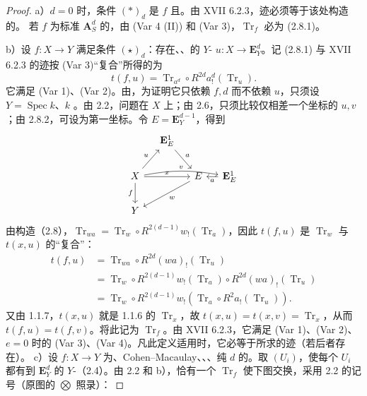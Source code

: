 \begin{proof}
a）$d=0$ 时，条件 $(*)_d$ 是 $f$ 且。由 XVII 6.2.3，迹必须等于该处构造的。
若 $f$ 为标准 $\mathbf A^d_S$ 的，由 (Var 4 (II)) 和 (Var 3)，$\operatorname{Tr}_f$ 必为 (2.8.1)。

b）设 $f:X\to Y$ 满足条件 $(\star)_d$：存在、、的 $Y$- $u:X\to\mathbf E^d_Y$。记 (2.8.1) 与 XVII 6.2.3 的迹按 (Var 3)“复合”所得的为
\[t(f,u)=\operatorname{Tr}_{a^d}\circ R^{2d}a^d_!(\operatorname{Tr}_u).\]
它满足 (Var 1)、(Var 2)。由，为证明它只依赖 $f,d$ 而不依赖 $u$，只须设 $Y=\operatorname{Spec}k$、$k$ 。由 2.2，问题在 $X$ 上；由 2.6，只须比较仅相差一个坐标的 $u,v$；由 2.8.2，可设为第一坐标。令 $E=\mathbf E^{d-1}_Y$，得到
\[\begin{tikzcd}[column sep=small]
&\mathbf E^1_E\arrow[dr,"a"]&\\
X\arrow[ur,"u"]\arrow[rr,"x"]\arrow[d,"f"']\arrow[rrr,"v",bend left=10]&&E\arrow[dll,"w"]&\mathbf E^1_E\arrow[l,"a"]\\
Y&&&
\end{tikzcd}\]
由构造（2.8），$\operatorname{Tr}_{wa}=\operatorname{Tr}_w\circ R^{2(d-1)}w_!(\operatorname{Tr}_a)$，因此 $t(f,u)$ 是 $\operatorname{Tr}_w$ 与 $t(x,u)$ 的“复合”：
\[\begin{aligned}
t(f,u)&=\operatorname{Tr}_{wa}\circ R^{2d}(wa)_!(\operatorname{Tr}_u)\\
&=\operatorname{Tr}_w\circ R^{2(d-1)}w_!(\operatorname{Tr}_a)\circ R^{2d}(wa)_!(\operatorname{Tr}_u)\\
&=\operatorname{Tr}_w\circ R^{2(d-1)}w_!(\operatorname{Tr}_a\circ R^2a_!(\operatorname{Tr}_u)).
\end{aligned}\]
又由 1.1.7，$t(x,u)$ 就是 1.1.6 的 $\operatorname{Tr}_x$，故 $t(x,u)=t(x,v)=\operatorname{Tr}_x$，从而 $t(f,u)=t(f,v)$。将此记为 $\operatorname{Tr}_f$。由 XVII 6.2.3，它满足 (Var 1)、(Var 2)、$e=0$ 时的 (Var 3)、(Var 4)。凡此定义适用时，它必等于所求的迹（若后者存在）。
c）设 $f:X\to Y$ 为、Cohen--Macaulay、、、纯 $d$ 的。取 $(U_i)$，使每个 $U_i$ 都有到 $\mathbf E^d_Y$ 的 $Y$-（2.4）。由 2.2 和 b），恰有一个 $\operatorname{Tr}_f$ 使下图交换，采用 2.2 的记号（原图的 $\bigotimes$ 照录）：

\end{proof}
